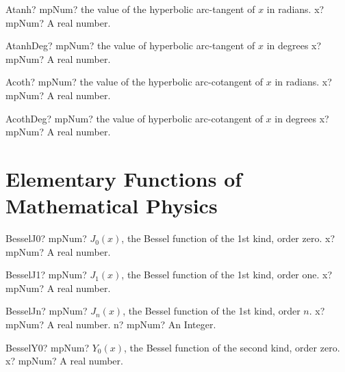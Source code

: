 \documentclass[12pt,a4paper,openany]{book}
\begin{document}
\begin{mpFunctionsExtract}
\mpFunctionOne
{Atanh? mpNum? the value of the hyperbolic arc-tangent  of $x$ in radians.}
{x? mpNum? A real number.}
\end{mpFunctionsExtract}

\begin{mpFunctionsExtract}
\mpFunctionOne
{AtanhDeg? mpNum? the value of hyperbolic arc-tangent  of $x$ in degrees}
{x? mpNum? A real number.}
\end{mpFunctionsExtract}

\begin{mpFunctionsExtract}
\mpFunctionOne
{Acoth? mpNum? the value of the hyperbolic arc-cotangent  of $x$ in radians.}
{x? mpNum? A real number.}
\end{mpFunctionsExtract}

\begin{mpFunctionsExtract}
\mpFunctionOne
{AcothDeg? mpNum? the value of hyperbolic arc-cotangent  of $x$ in degrees}
{x? mpNum? A real number.}
\end{mpFunctionsExtract}

\section{Elementary Functions of Mathematical Physics}

\begin{mpFunctionsExtract}
\mpFunctionOne
{BesselJ0? mpNum? $J_0(x)$, the Bessel function of the 1st kind, order zero.}
{x? mpNum? A real number.}
\end{mpFunctionsExtract}

\begin{mpFunctionsExtract}
\mpFunctionOne
{BesselJ1? mpNum? $J_1(x)$, the Bessel function of the 1st kind, order one.}
{x? mpNum? A real number.}
\end{mpFunctionsExtract}

\begin{mpFunctionsExtract}
\mpFunctionTwo
{BesselJn? mpNum? $J_n(x)$, the Bessel function of the 1st kind, order $n$.}
{x? mpNum? A real number.}
{n? mpNum? An Integer.}
\end{mpFunctionsExtract}

\begin{mpFunctionsExtract}
\mpFunctionOne
{BesselY0? mpNum? $Y_0(x)$, the Bessel function of the second kind, order zero.}
{x? mpNum? A real number.}
\end{mpFunctionsExtract}
\end{document}
